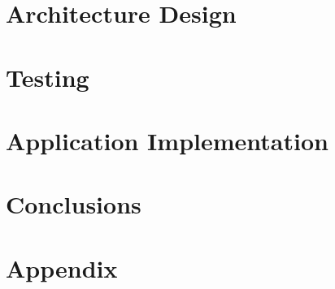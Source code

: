 \documentclass{report}
\begin{document}
\chapter{Architecture Design}


\chapter{Testing}


\chapter{Application Implementation}


\chapter{Conclusions}




{}


\chapter{Appendix}

\end{document}
